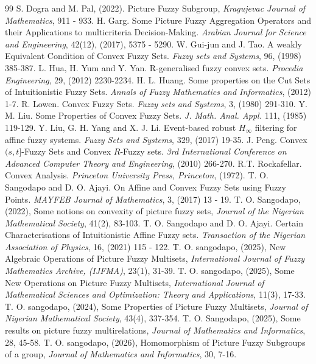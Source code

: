 \documentclass[12pt,letterpaper]{amsart}
\theoremstyle{plain}
\theoremstyle{definition}
\numberwithin{equation}{section}
\begin{document}
\begin{thebibliography}{99}
 S. Dogra and M. Pal, (2022). Picture Fuzzy Subgroup, \emph{Kragujevac Journal of Mathematics}, 911 - 933.
 H. Garg. Some Picture Fuzzy Aggregation Operators and their Applications to multicriteria Decision-Making. \emph{Arabian Journal for Science and Engineering}, 42(12), (2017), 5375 - 5290.
 W. Gui-jun and J. Tao. A weakly Equivalent Condition of Convex Fuzzy Sets. \emph {Fuzzy sets and Systems}, 96, (1998) 385-387. 
 L. Hua, H. Yum and Y. Yan. R-generalised fuzzy convex sets. \emph{Procedia Engineering}, 29, (2012) 2230-2234. 
 H. L. Huang. Some properties on the Cut Sets of Intuitionistic Fuzzy Sets. \emph {Annals of Fuzzy Mathematics and Informatics}, (2012) 1-7.
 R. Lowen. Convex Fuzzy Sets. \emph {Fuzzy sets and Systems}, 3, (1980) 291-310.
 Y. M. Liu. Some Properties of Convex Fuzzy Sets. \emph {J. Math. Anal. Appl.} 111, (1985) 119-129.
 Y. Liu, G. H. Yang and X. J. Li. Event-based robust $H_{\infty}$ filtering for affine fuzzy systems. \emph{Fuzzy Sets and Systems}, 329, (2017) 19-35. 
 J. Peng. Convex $(s, t]$-Fuzzy Sets and Convex $R$-Fuzzy sets. \emph{3rd International Conference on Advanced Computer Theory and Engineering}, (2010) 266-270.
 R.T. Rockafellar. Convex Analysis. \emph {Princeton University Press, Princeton}, (1972).
 T. O. Sangodapo and D. O. Ajayi. On Affine and Convex Fuzzy Sets using Fuzzy Points. \emph{MAYFEB Journal of Mathematics}, 3, (2017) 13 - 19.
 T. O. Sangodapo, (2022), Some notions on convexity of picture fuzzy sets, \emph{Journal of the Nigerian Mathematical Society}, 41(2), 83-103.
 T. O. Sangodapo and D. O. Ajayi. Certain Characterisations of Intuitionistic Affine Fuzzy sets. \emph{Transaction of the Nigerian Association of Physics}, 16, (2021) 115 - 122.
 T. O. sangodapo, (2025), New Algebraic Operations of Picture Fuzzy Multisets, \emph{International Journal of Fuzzy Mathematics Archive, (IJFMA)}, 23(1), 31-39.
 T. O. sangodapo, (2025), Some New Operations on Picture Fuzzy Multisets, \emph{International Journal of Mathematical Sciences and Optimization: Theory and Applications}, 11(3), 17-33.
 T. O. sangodapo, (2024), Some Properties of Picture Fuzzy Multisets, \emph{Journal of Nigerian Mathematical Society}, 43(4), 337-354.
 T. O. Sangodapo, (2025), Some results on picture fuzzy multirelations, \emph{Journal of Mathematics and Informatics}, 28, 45-58.
 T. O. sangodapo, (2026), Homomorphism of Picture Fuzzy Subgroups of a group, \emph{Journal of Mathematics and Informatics}, 30, 7-16.

\end{thebibliography}
\end{document}
